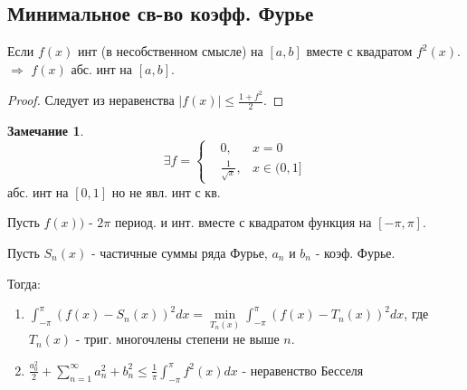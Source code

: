 \documentclass{article}
\theoremstyle{definition}
\numberwithin{theorem}{section}
\numberwithin{lemma}{section}
\numberwithin{definition}{section}
\numberwithin{corollary}{section}
\newtheorem*{remark}{Замечание}
\numberwithin{equation}{section}
\let\implies\Rightarrow
\begin{document}
\subsection{Минимальное св-во коэфф. Фурье}
\begin{lemma}
  Если $f(x)$ инт (в несобственном смысле) на $[a,b]$ вместе с квадратом $f^{2}(x)$.
  $\implies$ $f(x)$ абс. инт на $[a,b]$.
\end{lemma}
\begin{proof}
  Следует из неравенства $|f(x)|\le \frac{1+f^{2}}{2}$.
\end{proof}
\begin{remark}
  \[
    \exists f=\left\{\begin{aligned}
      &0, & x=0 \\ 
      &\frac{1}{\sqrt{x}}, & x\in (0, 1]
    \end{aligned}\right.
  \]
  абс. инт на $[0,1]$ но не явл. инт с кв.
\end{remark}
\begin{theorem}
  Пусть $f(x))$ - $2\pi$ период. и инт. вместе с квадратом функция на $[-\pi,\pi]$.

  Пусть $S_n(x)$ - частичные суммы ряда Фурье, $a_n$ и $b_n$ - коэф. Фурье.

  Тогда:
  \begin{enumerate}
    \item $\int_{-\pi}^{\pi}(f(x)-S_n(x))^{2}dx=\min\limits_{T_n(x)}\int_{-\pi}^{\pi}(f(x)-T_n(x))^{2}dx$,
      где $T_n(x)$ - триг. многочлены степени не выше $n$.
    \item $\frac{a_0^{2}}{2}+\sum_{n=1}^{\infty}a^{2}_n+b^{2}_{n}\le \frac{1}{\pi}\int_{-\pi}^{\pi}f^{2}(x)dx$
- неравенство Бесселя
  \end{enumerate}
\end{theorem}
\end{document}

